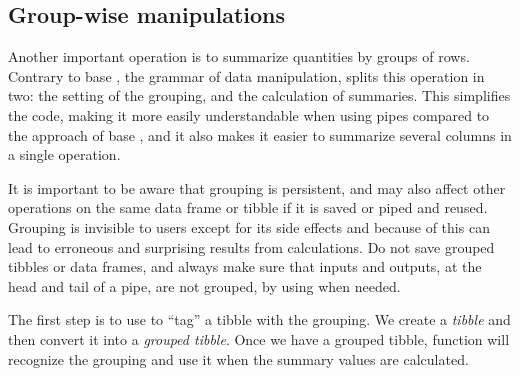\documentclass[krantz2]{krantz}\usepackage{knitr}
\begin{document}
\subsection{Group-wise manipulations}

Another important operation is to summarize quantities by groups of rows. Contrary to base \Rlang, the grammar of data manipulation, splits this operation in two: the setting of the grouping, and the calculation of summaries. This simplifies the code, making it more easily understandable when using pipes compared to the approach of base \Rlang {}, and it also makes it easier to summarize several columns in a single operation.

\begin{warningbox}
It is important to be aware that grouping is persistent, and may also affect other operations on the same data frame or tibble if it is saved or piped and reused. Grouping is invisible to users except for its side effects and because of this can lead to erroneous and surprising results from calculations. Do not save grouped tibbles or data frames, and always make sure that inputs and outputs, at the head and tail of a pipe, are not grouped, by using  when needed.
\end{warningbox}

The first step is to use  to ``tag'' a tibble with the grouping. We create a \emph{tibble} and then convert it into a \emph{grouped tibble}. Once we have a grouped tibble, function  will recognize the grouping and use it when the summary values are calculated.

\begin{knitrout}\footnotesize
{}\color{fgcolor}
\end{knitrout}
\end{document}
